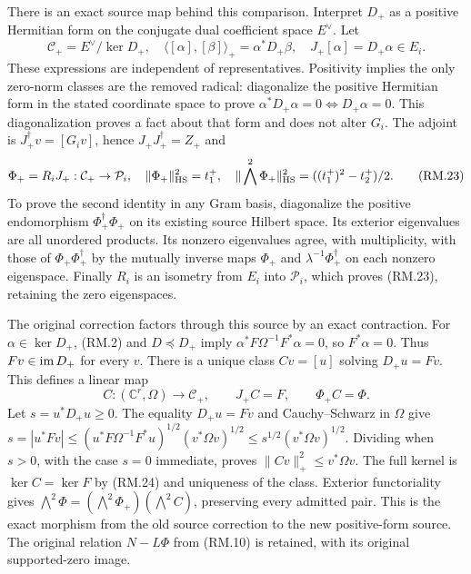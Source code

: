 There is an exact source map behind this comparison. Interpret $D_+$ as
a positive Hermitian form on the conjugate dual coefficient space $E^\vee$.
Let
\begin{equation}
 \mathcal C_+=E^\vee/\ker D_+,\quad
 \langle[\alpha],[\beta]\rangle_+=\alpha^*D_+\beta,\quad
 J_+[\alpha]=D_+\alpha\in E_i.\tag{RM.22}
\end{equation}
These expressions are independent of representatives. Positivity implies
the only zero-norm classes are the removed radical: diagonalize the positive
Hermitian form in the stated coordinate space to prove
$\alpha^*D_+\alpha=0\Longleftrightarrow D_+\alpha=0$.
This diagonalization proves a fact about that form and does not alter $G_i$.
The adjoint is $J_+^\dagger v=[G_iv]$, hence
$J_+J_+^\dagger=Z_+$ and
\begin{equation}
 \Phi_+=R_iJ_+:\mathcal C_+\to\mathcal P_i,\quad
 \|\Phi_+\|_{\mathrm{HS}}^2=t_1^+,\quad
 \|\bigwedge^2\Phi_+\|_{\mathrm{HS}}^2=((t_1^+)^2-t_2^+)/2.\tag{RM.23}
\end{equation}
To prove the second identity in any Gram basis, diagonalize the positive
endomorphism $\Phi_+^\dagger\Phi_+$ on its existing source Hilbert space.
Its exterior eigenvalues are all unordered products. Its nonzero eigenvalues
agree, with multiplicity, with those of $\Phi_+\Phi_+^\dagger$ by the
mutually inverse maps $\Phi_+$ and $\lambda^{-1}\Phi_+^\dagger$ on each
nonzero eigenspace. Finally $R_i$ is an isometry from $E_i$ into
$\mathcal P_i$, which proves (RM.23), retaining the zero eigenspaces.

The original correction factors through this source by an exact contraction.
For $\alpha\in\ker D_+$, (RM.2) and $D\preceq D_+$ imply
$\alpha^*F\Omega^{-1}F^*\alpha=0$, so $F^*\alpha=0$.
Thus $Fv\in\operatorname{im} D_+$ for every $v$. There is a unique class $C v=[u]$
solving $D_+u=Fv$. This defines a linear map
\begin{equation}
 C:(\mathbb C^r,\Omega)\to\mathcal C_+,\qquad
 J_+C=F,\qquad \Phi_+C=\Phi.\tag{RM.24}
\end{equation}
Let $s=u^*D_+u\ge0$. The equality $D_+u=Fv$ and Cauchy--Schwarz in
$\Omega$ give
$s=|u^*Fv|\le (u^*F\Omega^{-1}F^*u)^{1/2}(v^*\Omega v)^{1/2}
\le s^{1/2}(v^*\Omega v)^{1/2}$. Dividing when $s>0$, with the case
$s=0$ immediate, proves $\|Cv\|_+^2\le v^*\Omega v$.
The full kernel is $\ker C=\ker F$ by (RM.24) and uniqueness of the
class. Exterior functoriality gives
$\bigwedge^2\Phi=(\bigwedge^2\Phi_+)(\bigwedge^2 C)$, preserving
every admitted pair. This is the exact morphism from the old source
correction to the new positive-form source. The original relation
$N-L\Phi$ from (RM.10) is retained, with its original supported-zero image.


